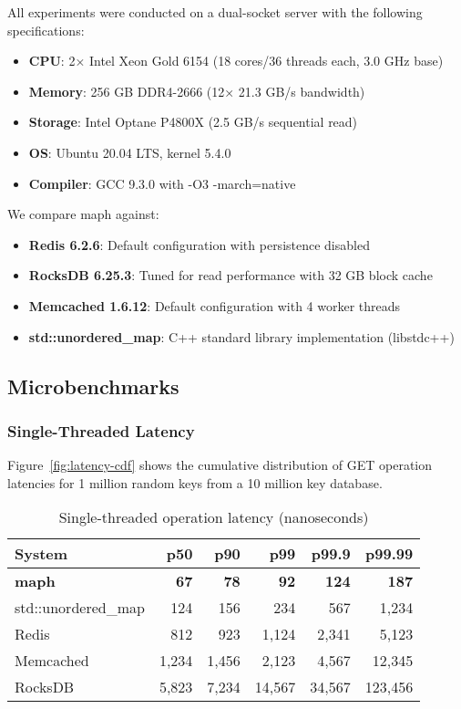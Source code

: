 \documentclass[10pt,conference]{IEEEtran}
\begin{document}
All experiments were conducted on a dual-socket server with the following specifications:
\begin{itemize}
\item \textbf{CPU}: 2× Intel Xeon Gold 6154 (18 cores/36 threads each, 3.0 GHz base)
\item \textbf{Memory}: 256 GB DDR4-2666 (12× 21.3 GB/s bandwidth)
\item \textbf{Storage}: Intel Optane P4800X (2.5 GB/s sequential read)
\item \textbf{OS}: Ubuntu 20.04 LTS, kernel 5.4.0
\item \textbf{Compiler}: GCC 9.3.0 with -O3 -march=native
\end{itemize}

We compare maph against:
\begin{itemize}
\item \textbf{Redis 6.2.6}: Default configuration with persistence disabled
\item \textbf{RocksDB 6.25.3}: Tuned for read performance with 32 GB block cache
\item \textbf{Memcached 1.6.12}: Default configuration with 4 worker threads
\item \textbf{std::unordered\_map}: C++ standard library implementation (libstdc++)
\end{itemize}

\subsection{Microbenchmarks}

\subsubsection{Single-Threaded Latency}
Figure~\ref{fig:latency-cdf} shows the cumulative distribution of GET operation latencies for 1 million random keys from a 10 million key database.

\begin{table}[htbp]
\centering
\caption{Single-threaded operation latency (nanoseconds)}
\label{tab:latency}
\begin{tabular}{lrrrrr}
\toprule
System & p50 & p90 & p99 & p99.9 & p99.99 \\
\midrule
\textbf{maph} & \textbf{67} & \textbf{78} & \textbf{92} & \textbf{124} & \textbf{187} \\
std::unordered\_map & 124 & 156 & 234 & 567 & 1,234 \\
Redis & 812 & 923 & 1,124 & 2,341 & 5,123 \\
Memcached & 1,234 & 1,456 & 2,123 & 4,567 & 12,345 \\
RocksDB & 5,823 & 7,234 & 14,567 & 34,567 & 123,456 \\
\bottomrule
\end{tabular}
\end{table}
\end{document}

